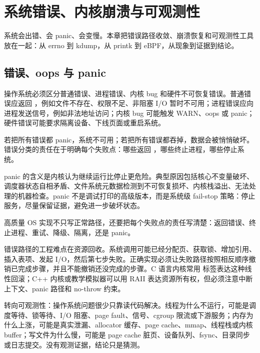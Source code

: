 \chapter{系统错误、内核崩溃与可观测性}

系统会出错、会 panic、会变慢。本章把错误路径收敛、崩溃恢复和可观测性工具放在一起：从 errno 到 kdump，从 printk 到 eBPF，从现象到证据到结论。

\section{错误、oops 与 panic}

操作系统必须区分普通错误、进程错误、内核 bug 和硬件不可恢复错误。普通错误应返回 ，例如文件不存在、权限不足、非阻塞 I/O 暂时不可用；进程错误应向进程发送信号，例如非法地址访问；内核 bug 可能触发 WARN、oops 或 panic；硬件错误可能要求隔离设备、下线页面或重启系统。

\begin{warningbox}
若把所有错误都 panic，系统不可用；若把所有错误都吞掉，数据会被悄悄破坏。错误分类的责任在于明确每个失败点：哪些返回 ，哪些终止进程，哪些停止系统。
\end{warningbox}

panic 的含义是内核认为继续运行比停止更危险。典型原因包括核心不变量破坏、调度器状态自相矛盾、文件系统元数据检测到不可恢复损坏、内核栈溢出、无法处理的机器检查。panic 不是调试打印的高级版本，而是系统级 fail-stop 策略：停止服务，尽量保留证据，避免进一步破坏状态。

\begin{keyidea}
高质量 OS 实现不只写正常路径，还要把每个失败点的责任写清楚：返回错误、终止进程、重试、降级、隔离，还是 panic。
\end{keyidea}

错误路径的工程难点在资源回收。系统调用可能已经分配页、获取锁、增加引用、插入表项、发起 I/O，然后第七步失败。正确实现必须让失败路径按照相反顺序撤销已完成步骤，并且不能撤销还没完成的步骤。C 语言内核常用  标签表达这种线性回滚；C++ 内核或教学模拟器可以用 RAII 表达资源所有权，但必须注意中断上下文、panic 路径和 no-throw 约束。

转向可观测性：操作系统问题很少只靠读代码解决。线程为什么不运行，可能是调度等待、锁等待、I/O 阻塞、page fault、信号、cgroup 限流或下游服务；内存为什么上涨，可能是真实泄漏、allocator 缓存、page cache、mmap、线程栈或内核 buffer；写文件为什么慢，可能是 page cache 脏页、设备队列、fsync、目录同步或日志提交。没有观测证据，结论只是猜测。

